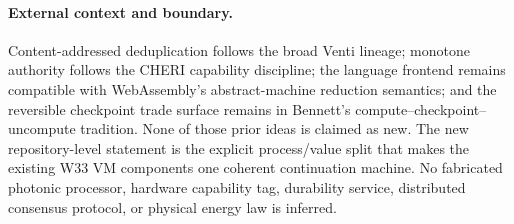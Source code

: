 \paragraph{External context and boundary.}
Content-addressed deduplication follows the broad Venti lineage; monotone
authority follows the CHERI capability discipline; the language frontend
remains compatible with WebAssembly's abstract-machine reduction semantics; and
the reversible checkpoint trade surface remains in Bennett's
compute--checkpoint--uncompute tradition. None of those prior ideas is claimed
as new. The new repository-level statement is the explicit process/value split
that makes the existing W33 VM components one coherent continuation machine.
No fabricated photonic processor, hardware capability tag, durability service,
distributed consensus protocol, or physical energy law is inferred.
